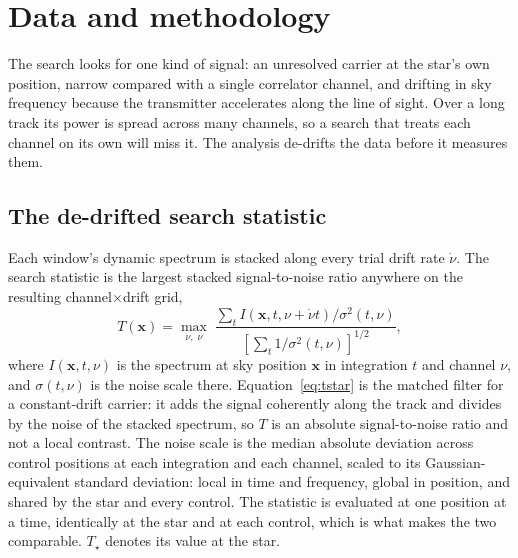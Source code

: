 \section{Data and methodology}
\label{sec:method}

The search looks for one kind of signal: an unresolved carrier at the
star's own position, narrow compared with a single correlator channel, and
drifting in sky frequency because the transmitter accelerates along the line
of sight. Over a long track its power is spread across many channels, so a
search that treats each channel on its own will miss it. The analysis
de-drifts the data before it measures them.

\subsection{The de-drifted search statistic}
\label{sec:statistic}

Each window's dynamic spectrum is stacked along every trial drift rate
$\dot\nu$. The search statistic is the largest stacked signal-to-noise
ratio anywhere on the resulting channel$\times$drift grid,
%
\begin{equation}
T(\mathbf{x})=\max_{\dot\nu,\;\nu}\;
\frac{\sum_{t} I\!\left(\mathbf{x},t,\nu+\dot\nu t\right)\big/\sigma^{2}(t,\nu)}
     {\left[\sum_{t}1\big/\sigma^{2}(t,\nu)\right]^{1/2}},
\label{eq:tstar}
\end{equation}
%
where $I(\mathbf{x},t,\nu)$ is the spectrum at sky position $\mathbf{x}$
in integration $t$ and channel $\nu$, and $\sigma(t,\nu)$ is the noise scale
there. Equation~\ref{eq:tstar} is the matched filter for a constant-drift
carrier: it adds the signal coherently along the track and divides by the
noise of the stacked spectrum, so $T$ is an absolute signal-to-noise ratio
and not a local contrast. The noise scale is the median absolute deviation
across \NCtrl{} control positions at each integration and each channel,
scaled to its Gaussian-equivalent standard deviation: local in time and
frequency, global in position, and shared by the star and every control.
The statistic is evaluated at one position at a time, identically at the
star and at each control, which is what makes the two comparable.
$T_\star$ denotes its value at the star.

